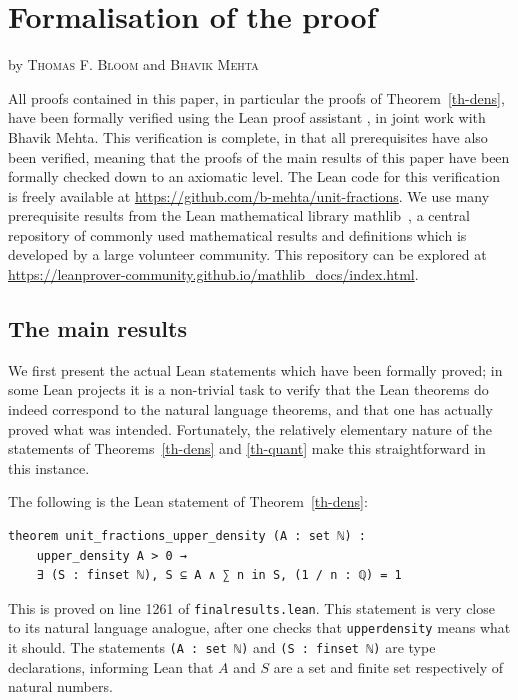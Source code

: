 \documentclass{amsart}
\newcommand{\mathlib}{\textsf{mathlib}}
\begin{document}
\section{Formalisation of the proof}\label{app:form}
\smallskip
\begin{center}by \textsc{Thomas F. Bloom} and \textsc{Bhavik Mehta}\end{center}
\medskip

All proofs contained in this paper, in particular the proofs of Theorem~\ref{th-dens}, have been formally verified using the Lean proof assistant \cite{MouraLean}, in joint work with Bhavik Mehta. This verification is complete, in that all prerequisites have also been verified, meaning that the proofs of the main results of this paper have been formally checked down to an axiomatic level. The Lean code for this verification is freely available at \url{https://github.com/b-mehta/unit-fractions}. We use many prerequisite results from the Lean mathematical library \mathlib\ \cite{mathlib}, a central repository of commonly used mathematical results and definitions which is developed by a large volunteer community. This repository can be explored at \url{https://leanprover-community.github.io/mathlib_docs/index.html}.

\subsection{The main results}
We first present the actual Lean statements which have been formally proved; in some Lean projects it is a non-trivial task to verify that the Lean theorems do indeed correspond to the natural language theorems, and that one has actually proved what was intended. Fortunately, the relatively elementary nature of the statements of Theorems~\ref{th-dens} and \ref{th-quant} make this straightforward in this instance. 

The following is the Lean statement of Theorem~\ref{th-dens}:
\begin{lstlisting}
theorem unit_fractions_upper_density (A : set ℕ) : 
    upper_density A > 0 → 
    ∃ (S : finset ℕ), S ⊆ A ∧ ∑ n in S, (1 / n : ℚ) = 1
\end{lstlisting}
This is proved on line 1261 of \texttt{final\textunderscore results.lean}. This statement is very close to its natural language analogue, after one checks that \texttt{upper\textunderscore density} means what it should. The statements \lstinline{(A : set ℕ)} and \lstinline{(S : finset ℕ)} are type declarations, informing Lean that $A$ and $S$ are a set and finite set respectively of natural numbers. 
\end{document}
